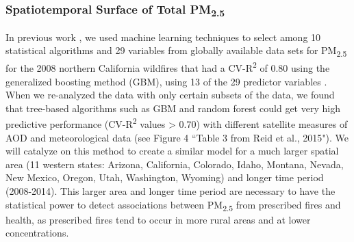 \documentclass[authoryear]{elsarticle}
\begin{document}
% 
% 

\subsubsection{Spatiotemporal Surface of Total \texorpdfstring{PM\textsubscript{2.5}}{}}

In previous work \citep{Reid2015}, we used machine learning techniques to select among 10 statistical algorithms and 29 variables from globally available data sets for PM\textsubscript{2.5} for the 2008 northern California wildfires that had a CV-R\textsuperscript{2} of 0.80 using the generalized boosting method (GBM), using 13 of the 29 predictor variables \citep{Reid2015}. When we re-analyzed the data with only certain subsets of the data, we found that tree-based algorithms such as GBM and random forest could get very high predictive performance (CV-R\textsuperscript{2} values > 0.70) with different satellite measures of AOD and meteorological data (see Figure 4 ``Table 3 from Reid et al., 2015"). %
We will catalyze on this method to create a similar model for a much larger spatial area (11 western states: Arizona, California, Colorado, Idaho, Montana, Nevada, New Mexico, Oregon, Utah, Washington, Wyoming) and longer time period (2008-2014). This larger area and longer time period are necessary to have the statistical power to detect associations between PM\textsubscript{2.5} from prescribed fires and health, as prescribed fires tend to occur in more rural areas and at lower concentrations.

\end{document}
